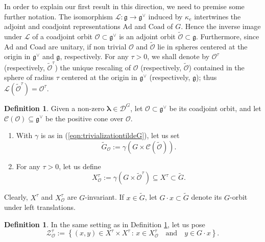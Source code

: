 \documentclass[12pt,a4paper]{article}
\theoremstyle{plain}
\theoremstyle{definition}
\newtheorem{defn}[thm]{Definition}%
\begin{document}
In order to explain our first result in this direction, 
we need to premise some further notation. 
The isomorphism 
$\mathcal{L}:\mathfrak{g}\rightarrow \mathfrak{g}^\vee$
induced by $\kappa_e$ intertwines
the adjoint and coadjoint representations
$\mathrm{Ad}$ and $\mathrm{Coad}$ of $G$.
Hence the inverse image under 
$\mathcal{L}$ of a coadjoint orbit
$\mathcal{O} \subset \mathfrak{g}^\vee$ is an
adjoint orbit $\tilde{\mathcal{O}} \subset \mathfrak{g}$.
Furthermore, since 
$\mathrm{Ad}$ and $\mathrm{Coad}$
are unitary, 
if non trivial
$\mathcal{O}$ and $\tilde{\mathcal{O}}$
lie in spheres centered at the origin in $\mathfrak{g}^\vee$
and $\mathfrak{g}$, respectively.
For any $\tau>0$, we shall denote by $\mathcal{O}^{\tau}$
(respectively, $\tilde{\mathcal{O}}^{\tau}$) the
unique rescaling of $\mathcal{O}$ (respectively, $\tilde{\mathcal{O}}$) contained in the sphere
of radius $\tau$ centered at the origin 
in $\mathfrak{g}^\vee$
(respectively, $\mathfrak{g}$); thus 
$\mathcal{L}( \tilde{\mathcal{O}}^{\tau})=\mathcal{O}^{\tau}$.


\begin{defn}
\label{defn:defn di XtauO}
Given a non-zero $\boldsymbol{\lambda}\in \mathcal{D}^G$, 
let $\mathcal{O} \subset \mathfrak{g}^\vee$ be its
coadjoint orbit, and let $\mathcal{C}(\mathcal{O})\subseteq
\mathfrak{g}^\vee$ be the positive cone over $\mathcal{O}$.

\begin{enumerate}
    \item With $\gamma$ is as in (\ref{eqn:trivializationtildeG}), let us set
    $$
    \tilde{G}_{\mathcal{O}}:=
\gamma\left(G\times \mathcal{C}(\tilde{\mathcal{O}})\right).
    $$
    \item For any $\tau>0$, let us define
$$
X^\tau_{\mathcal{O}}:=
\gamma (G\times \tilde{\mathcal{O}}^\tau)
\subseteq X^\tau\subset \tilde{G}.
$$
\end{enumerate}
\end{defn}

Clearly, $X^\tau$ and $X^\tau_{\mathcal{O}}$ are 
$G$-invariant.
If $x\in \tilde{G}$, let $G\cdot x \subset \tilde{G}$
denote its $G$-orbit under left translations.

\begin{defn}
\label{eqn:defn di ZtauO}
In the same setting as in Definition
\ref{defn:defn di XtauO}, let us pose
$$ 
\mathcal{Z}^\tau_{\mathcal{O}}:=
\left\{(x,y)\in X^\tau\times X^\tau\,:\,
x\in X^\tau_{\mathcal{O}}\quad\text{and}\quad
y\in G\cdot x\right\}.
$$
\end{defn}
\end{document}
